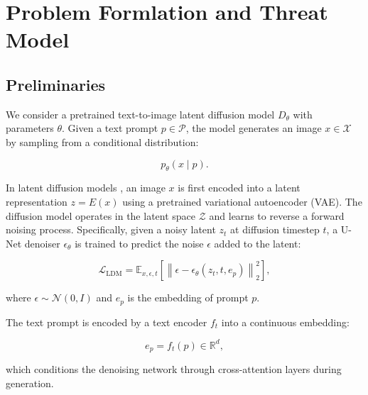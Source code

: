 \section{Problem Formlation and Threat Model}
\label{sec:threat_model}





\subsection{Preliminaries}

We consider a pretrained text-to-image latent diffusion model $D_{\theta}$ with parameters $\theta$. 
Given a text prompt $p \in \mathcal{P}$, the model generates an image $x \in \mathcal{X}$ by sampling from a conditional distribution:

\begin{equation}
p_{\theta}(x \mid p).
\end{equation}

In latent diffusion models \cite{rombach2022high}, an image $x$ is first encoded into a latent representation $z = E(x)$ using a pretrained variational autoencoder (VAE). 
The diffusion model operates in the latent space $\mathcal{Z}$ and learns to reverse a forward noising process. 
Specifically, given a noisy latent $z_t$ at diffusion timestep $t$, a U-Net denoiser $\epsilon_{\theta}$ is trained to predict the noise $\epsilon$ added to the latent:

\begin{equation}
\mathcal{L}_{\text{LDM}} =
\mathbb{E}_{x,\epsilon,t}
\left[
\left\|
\epsilon - \epsilon_{\theta}(z_t, t, e_p)
\right\|_2^2
\right],
\end{equation}

where $\epsilon \sim \mathcal{N}(0,I)$ and $e_p$ is the embedding of prompt $p$.

The text prompt is encoded by a text encoder $f_t$ into a continuous embedding:

\begin{equation}
e_p = f_t(p) \in \mathbb{R}^d,
\end{equation}

which conditions the denoising network through cross-attention layers during generation.

